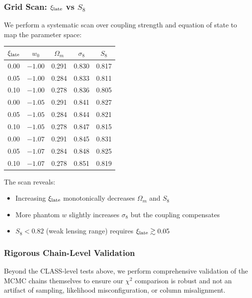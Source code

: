 \documentclass[twocolumn,showpacs,preprintnumbers,amsmath,amssymb,prd]{revtex4-2}
\begin{document}
\subsubsection{Grid Scan: $\xi_{\rm late}$ vs $S_8$}

We perform a systematic scan over coupling strength and equation of state to map the parameter space:
\begin{center}
\begin{tabular}{ccccc}
\toprule
$\xi_{\rm late}$ & $w_0$ & $\Omega_m$ & $\sigma_8$ & $S_8$ \\
\midrule
0.00 & $-1.00$ & 0.291 & 0.830 & 0.817 \\
0.05 & $-1.00$ & 0.284 & 0.833 & 0.811 \\
0.10 & $-1.00$ & 0.278 & 0.836 & 0.805 \\
\midrule
0.00 & $-1.05$ & 0.291 & 0.841 & 0.827 \\
0.05 & $-1.05$ & 0.284 & 0.844 & 0.821 \\
0.10 & $-1.05$ & 0.278 & 0.847 & 0.815 \\
\midrule
0.00 & $-1.07$ & 0.291 & 0.845 & 0.831 \\
0.05 & $-1.07$ & 0.284 & 0.848 & 0.825 \\
0.10 & $-1.07$ & 0.278 & 0.851 & 0.819 \\
\bottomrule
\end{tabular}
\end{center}

The scan reveals:
\begin{itemize}
    \item Increasing $\xi_{\rm late}$ monotonically decreases $\Omega_m$ and $S_8$
    \item More phantom $w$ slightly increases $\sigma_8$ but the coupling compensates
    \item $S_8 < 0.82$ (weak lensing range) requires $\xi_{\rm late} \gtrsim 0.05$
\end{itemize}

\subsubsection{Rigorous Chain-Level Validation}

Beyond the CLASS-level tests above, we perform comprehensive validation of the MCMC chains themselves to ensure our $\chi^2$ comparison is robust and not an artifact of sampling, likelihood misconfiguration, or column misalignment.
\end{document}

